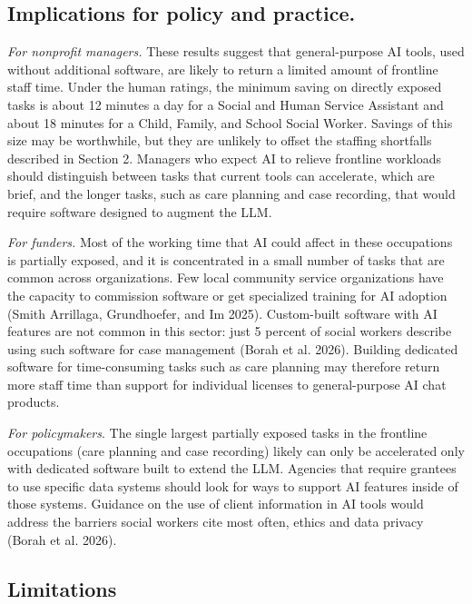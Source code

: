 \setcounter{subsection}{1} %

\subsection{Implications for policy and practice.}

\emph{For nonprofit managers.} These results suggest that general-purpose AI tools, used without additional software, are likely to return a limited amount of frontline staff time. Under the human ratings, the minimum saving on directly exposed tasks is about 12 minutes a day for a Social and Human Service Assistant and about 18 minutes for a Child, Family, and School Social Worker. Savings of this size may be worthwhile, but they are unlikely to offset the staffing shortfalls described in Section 2. Managers who expect AI to relieve frontline workloads should distinguish between tasks that current tools can accelerate, which are brief, and the longer tasks, such as care planning and case recording, that would require software designed to augment the LLM.

\emph{For funders.} Most of the working time that AI could affect in these occupations is partially exposed, and it is concentrated in a small number of tasks that are common across organizations. Few local community service organizations have the capacity to commission software or get specialized training for AI adoption (Smith Arrillaga, Grundhoefer, and Im 2025). Custom-built software with AI features are not common in this sector: just 5 percent of social workers describe using such software for case management (Borah et al. 2026). Building dedicated software for time-consuming tasks such as care planning may therefore return more staff time than support for individual licenses to general-purpose AI chat products.

\emph{For policymakers}. The single largest partially exposed tasks in the frontline occupations (care planning and case recording) likely can only be accelerated only with dedicated software built to extend the LLM. Agencies that require grantees to use specific data systems should look for ways to support AI features inside of those systems. Guidance on the use of client information in AI tools would address the barriers social workers cite most often, ethics and data privacy (Borah et al. 2026).

\subsection{Limitations}


